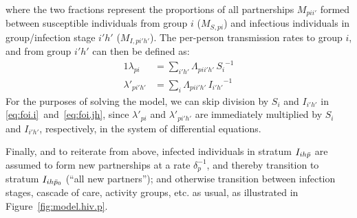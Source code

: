 where the two fractions represent the proportions of all partnerships $M_{pii'}$
formed between susceptible individuals from group $i$ ($M_{S,pi}$)
and infectious individuals in group/infection stage $i'h'$ ($M_{I,pi'h'}$).
The per-person transmission rates to group $i$, and from group $i'h'$ can then be defined as:
\begin{alignat}{1}
  \lambda_{pi} &= \sum_{i'h'} \Lambda_{pii'h'}\,{S_{i}}^{-1} \label{eq:foi.i} \\
  \lambda'_{pi'h'} &= \sum_{i} \Lambda_{pii'h'}\,{I_{i'h'}}^{-1} \label{eq:foi.jh}
\end{alignat}
For the purposes of solving the model,
we can skip division by $S_{i}$ and $I_{i'h'}$ in \eqref{eq:foi.i}~and~\eqref{eq:foi.jh},
since $\lambda'_{pi}$ and $\lambda'_{pi'h'}$ are immediately multiplied by $S_{i}$ and $I_{i'h'}$,
respectively, in the system of differential equations.
\par
Finally, and to reiterate from above, infected individuals in stratum $I_{ih\bar{p}}$
are assumed to form new partnerships at a rate $\delta_p^{-1}$,
and thereby transition to stratum $I_{ih\bar{p}_0}$ (``all new partners''); and
otherwise transition between infection stages, cascade of care, activity groups, etc. as usual,
as illustrated in Figure~\ref{fig:model.hiv.p}.
